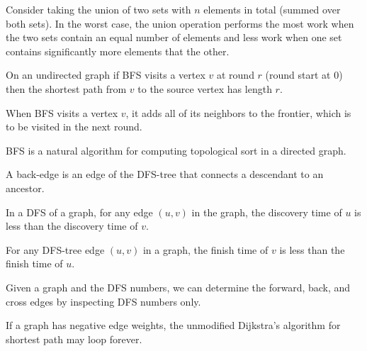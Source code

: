 \begin{parts}

\trueorfalse 

Consider taking the union of two sets with $n$ elements in total
(summed over both sets).  In the worst case, the union operation
performs the most work when the two sets contain an equal number of
elements and less work when one set contains significantly more
elements that the other.

\atrue

\trueorfalse

On an undirected graph if  BFS visits a vertex $v$ at round $r$ (round
start at $0$) then the shortest path from $v$ to the source vertex has
length $r$.

\atrue


\trueorfalse

When BFS visits a vertex $v$, it adds all of its neighbors to the
frontier, which is to be visited in the next round.

\afalse

\trueorfalse

BFS is a natural algorithm for computing topological sort in a directed graph.

\afalse



\trueorfalse
A back-edge is an edge of the DFS-tree that connects a descendant to
an ancestor.
\afalse

\trueorfalse 

In a DFS of a graph, for any edge $(u,v)$ in the graph, the discovery
time of $u$ is less than the discovery time of $v$.  

\afalse


\trueorfalse 
For any DFS-tree edge $(u,v)$ in a graph, the finish time of $v$ is
less than the finish time of $u$.  
\atrue

\trueorfalse 
Given a graph and the DFS numbers, we can determine the
forward, back, and cross edges by inspecting DFS numbers only.  
\atrue

\trueorfalse

If a graph has negative edge weights, the unmodified Dijkstra's
algorithm for shortest path may loop forever.


\end{parts}
